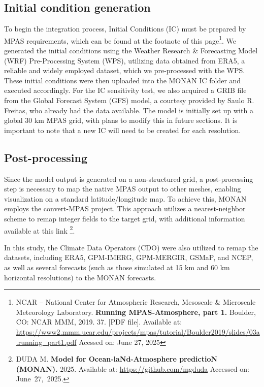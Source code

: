 \subsection{Initial condition generation}

To begin the integration process, Initial Conditions (IC) must be prepared by MPAS requirements, which can be found at the footnote of this page\footnote{NCAR – National Center for Atmospheric Research, Mesoscale \& Microscale Meteorology Laboratory. \textbf{Running MPAS‑Atmosphere, part 1.} Boulder, CO: NCAR MMM, 2019. 37. [PDF file]. Available at: \url{https://www2.mmm.ucar.edu/projects/mpas/tutorial/Boulder2019/slides/03a.running_part1.pdf} Acessed on: June 27, 2025}.
We generated the initial conditions using the Weather Research \& Forecasting Model (WRF) Pre-Processing System (WPS), utilizing data obtained from ERA5, a reliable and widely employed dataset, which we pre-processed with the WPS. These initial conditions were then uploaded into the MONAN IC folder and executed accordingly. For the IC sensitivity test, we also acquired a GRIB file from the Global Forecast System (GFS) model, a courtesy provided by Saulo R. Freitas, who already had the data available. The model is initially set up with a global 30 km MPAS grid, with plans to modify this in future sections. It is important to note that a new IC will need to be created for each resolution.

\subsection{Post-processing}

Since the model output is generated on a non-structured grid, a post-processing step is necessary to map the native MPAS output to other meshes, enabling visualization on a standard latitude/longitude map. To achieve this, MONAN employs the convert-MPAS project. This approach utilizes a nearest-neighbor scheme to remap integer fields to the target grid, with additional information available at this link \footnote{DUDA M. \textbf{Model for Ocean-laNd-Atmosphere predictioN (MONAN).} 2025. Available at: \url{https://github.com/mgduda} Accessed on: June 27, 2025.}.

In this study, the Climate Data Operators (CDO) were also utilized to remap the datasets, including ERA5, GPM-IMERG, GPM-MERGIR, GSMaP, and NCEP, as well as several forecasts (such as those simulated at 15 km and 60 km horizontal resolutions) to the MONAN forecasts.
